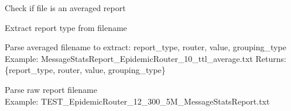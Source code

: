 \documentclass[a4paper,11pt,english,openany,oneside]{sphinxmanual}
\begin{document}
\begin{fulllineitems}
\begin{fulllineitems}
\end{fulllineitems}


\begin{fulllineitems}
\label{\detokenize{modules/core:core.analysis.SmartFileParser.is_average_file}}
\pysigstartsignatures
\pysiglinewithargsret
{}
{}
{}
\pysigstopsignatures
\sphinxAtStartPar
Check if file is an averaged report

\end{fulllineitems}


\begin{fulllineitems}
\label{\detokenize{modules/core:core.analysis.SmartFileParser.get_report_type}}
\pysigstartsignatures
\pysiglinewithargsret
{}
{}
{}
\pysigstopsignatures
\sphinxAtStartPar
Extract report type from filename

\end{fulllineitems}


\begin{fulllineitems}
\label{\detokenize{modules/core:core.analysis.SmartFileParser.parse_average_filename}}
\pysigstartsignatures
\pysiglinewithargsret
{}
{}
{}
\pysigstopsignatures
\sphinxAtStartPar
Parse averaged filename to extract: report\_type, router, value, grouping\_type
Example: MessageStatsReport\_EpidemicRouter\_10\_ttl\_average.txt
Returns: \{report\_type, router, value, grouping\_type\}

\end{fulllineitems}


\begin{fulllineitems}
\label{\detokenize{modules/core:core.analysis.SmartFileParser.parse_raw_filename}}
\pysigstartsignatures
\pysiglinewithargsret
{}
{}
{}
\pysigstopsignatures
\sphinxAtStartPar
Parse raw report filename
\\Example: TEST\_EpidemicRouter\_12\_300\_5M\_MessageStatsReport.txt


\end{fulllineitems}
\end{fulllineitems}
\end{document}
